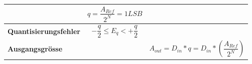 \begin{longtable}[c]{| p{6cm} | p{6cm} | p{6cm} | }
&
\begin{equation}
q = \frac{A_{Ref}}{2^N} = 1LSB
\end{equation}
\\
\hline
\begin{minipage}{6cm}
\textbf{Quantisierungsfehler}
\end{minipage}
&
\begin{equation}
-\frac{q}{2}\leq E_{q}<+\frac{q}{2}
\end{equation}
&
\\
\hline
\begin{minipage}{6cm}
\textbf{Ausgangsgrösse}
\end{minipage}
&
&
\begin{equation}
A_{out} = D_{in}*q = D_{in}*(\frac{A_{Ref}}{2^N})
\end{equation}\\
\hline
\end{longtable}

